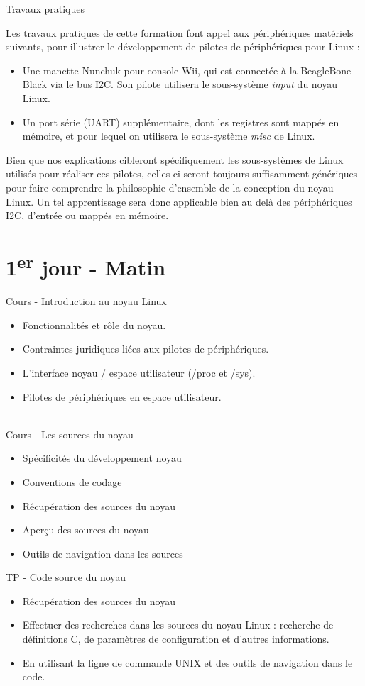 \documentclass[a4paper,12pt,obeyspaces,spaces,hyphens]{article}
\begin{document}
\feagendaonecolumn
{Travaux pratiques}
{
  Les travaux pratiques de cette formation font appel aux périphériques
  matériels suivants, pour illustrer le développement de pilotes de
  périphériques pour Linux :

  \begin{itemize}
  \item Une manette Nunchuk pour console Wii, qui est connectée à la
    BeagleBone Black via le bus I2C. Son pilote utilisera le
    sous-système {\em input} du noyau Linux.
  \item Un port série (UART) supplémentaire, dont les registres sont
    mappés en mémoire, et pour lequel on utilisera le sous-système {\em
    misc} de Linux.
  \end{itemize}

  Bien que nos explications cibleront spécifiquement les sous-systèmes
  de Linux utilisés pour réaliser ces pilotes, celles-ci seront toujours
  suffisamment génériques pour faire comprendre la philosophie
  d'ensemble de la conception du noyau Linux. Un tel apprentissage
  sera donc applicable bien au delà des périphériques I2C, d'entrée ou
  mappés en mémoire.
}


\section{1\textsuperscript{er} jour - Matin}

\feagendaonecolumn
{Cours - Introduction au noyau Linux}
{
  \begin{itemize}
  \item Fonctionnalités et rôle du noyau.
  \item Contraintes juridiques liées aux pilotes de périphériques.
  \item L'interface noyau / espace utilisateur (/proc et /sys).
  \item Pilotes de périphériques en espace utilisateur.
  \end{itemize}
}
\\
\feagendatwocolumn
{Cours - Les sources du noyau}
{
  \begin{itemize}
  \item Spécificités du développement noyau
  \item Conventions de codage
  \item Récupération des sources du noyau
  \item Aperçu des sources du noyau
  \item Outils de navigation dans les sources
  \end{itemize}
}
{TP - Code source du noyau}
{
  \begin{itemize}
  \item Récupération des sources du noyau
  \item Effectuer des recherches dans les sources du noyau Linux :
    recherche de définitions C, de paramètres de configuration et d'autres
    informations.
  \item En utilisant la ligne de commande UNIX et des outils de
    navigation dans le code.
 \end{itemize}
}
\end{document}
